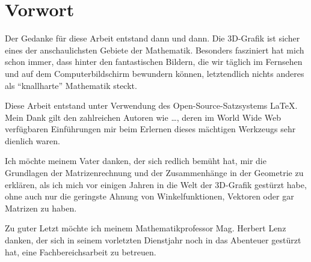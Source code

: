 \chapter{Vorwort}

Der Gedanke für diese Arbeit entstand dann und dann. Die 3D-Grafik ist sicher eines der anschaulichsten Gebiete der Mathematik. Besonders fasziniert hat mich schon immer, dass hinter den fantastischen Bildern, die wir täglich im Fernsehen und auf dem Computerbildschirm bewundern können, letztendlich nichts anderes als \enquote{knallharte} Mathematik steckt.

Diese Arbeit entstand unter Verwendung des Open-Source-Satzsystems \LaTeX{}. Mein Dank gilt den zahlreichen Autoren wie \dots, deren im World Wide Web verfügbaren Einführungen mir beim Erlernen dieses mächtigen Werkzeugs sehr dienlich waren.

Ich möchte meinem Vater danken, der sich redlich bemüht hat, mir die Grundlagen der Matrizenrechnung und der Zusammenhänge in der Geometrie zu erklären, als ich mich vor einigen Jahren in die Welt der 3D-Grafik gestürzt habe, ohne auch nur die geringste Ahnung von Winkelfunktionen, Vektoren oder gar Matrizen zu haben.

Zu guter Letzt möchte ich meinem Mathematikprofessor Mag. Herbert Lenz danken, der sich in seinem vorletzten Dienstjahr noch in das Abenteuer gestürzt hat, eine Fachbereichsarbeit zu betreuen.